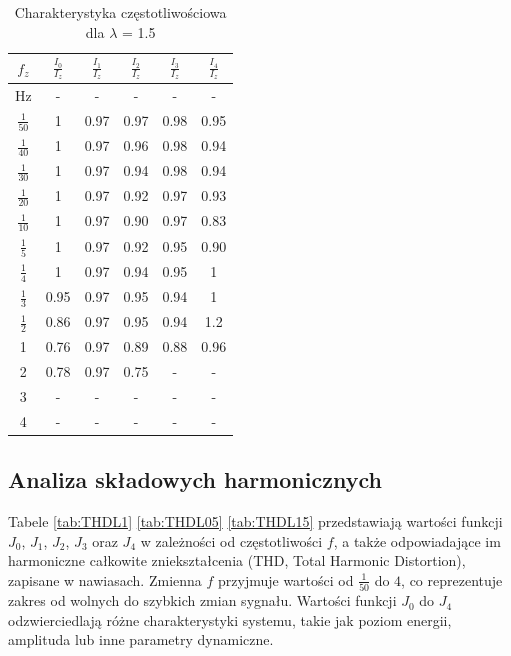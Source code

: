 \documentclass[journal,twoside,web]{ieeecolor}
\begin{document}
\begin{table}[h]
	\centering
	\caption{Charakterystyka częstotliwościowa dla $\lambda$ = 1.5}
	\label{tab:lam15} %
	\begin{tabular}{|c|c|c|c|c|c|}
		\hline
		$f_z$ & $\frac{I_{0}}{I_z}$ & $\frac{I_{1}}{I_z}$ & $\frac{I_{2}}{I_z}$ & $\frac{I_{3}}{I_z}$ & $\frac{I_{4}}{I_z}$ \\
		\hline
		Hz & - & - & - & - & - \\
		\hline
		$\frac{1}{50}$ & 1 & 0.97 & 0.97 & 0.98 & 0.95 \\
		\hline
		$\frac{1}{40}$ & 1 & 0.97 & 0.96 & 0.98 & 0.94 \\
		\hline
		$\frac{1}{30}$ & 1 & 0.97 & 0.94 & 0.98 & 0.94 \\
		\hline
		$\frac{1}{20}$ & 1 & 0.97 & 0.92 & 0.97 & 0.93 \\
		\hline
		$\frac{1}{10}$ & 1 & 0.97 & 0.90 & 0.97 & 0.83 \\
		\hline
		$\frac{1}{5}$ & 1 & 0.97 & 0.92 & 0.95 & 0.90 \\
		\hline
		$\frac{1}{4}$ & 1 & 0.97 & 0.94 & 0.95 & 1 \\
		\hline
		$\frac{1}{3}$ & 0.95 & 0.97 & 0.95 & 0.94 &1 \\
		\hline
		$\frac{1}{2}$ & 0.86 & 0.97 & 0.95 & 0.94 & 1.2 \\
		\hline
		1 & 			0.76 & 0.97 & 0.89 & 0.88 & 0.96 \\
		\hline
		2 & 			0.78 & 0.97 & 0.75 & - & - \\
		\hline
		3 & 			-	 & -    & - & - & - \\
		\hline
		4 & - & - & - & - & - \\
		\hline
	\end{tabular}
\end{table}
\subsection{Analiza składowych harmonicznych}
Tabele \ref{tab:THDL1} \ref{tab:THDL05} \ref{tab:THDL15}  przedstawiają wartości funkcji \(J_0\), \(J_1\), \(J_2\), \(J_3\) oraz \(J_4\) w zależności od częstotliwości \(f\), a także odpowiadające im harmoniczne całkowite zniekształcenia (THD, Total Harmonic Distortion), zapisane w nawiasach. Zmienna \(f\) przyjmuje wartości od \(\frac{1}{50}\) do \(4\), co reprezentuje zakres od wolnych do szybkich zmian sygnału. Wartości funkcji \(J_0\) do \(J_4\) odzwierciedlają różne charakterystyki systemu, takie jak poziom energii, amplituda lub inne parametry dynamiczne.
\end{document}
